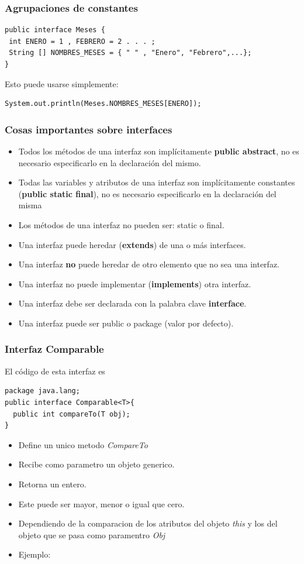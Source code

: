 \documentclass{beamer}
\begin{document}
\begin{frame}[fragile]
\frametitle{Agrupaciones de constantes}
{\color{purple}
\begin{verbatim}
public interface Meses {
 int ENERO = 1 , FEBRERO = 2 . . . ;
 String [] NOMBRES_MESES = { " " , "Enero", "Febrero",...};
}
\end{verbatim}}
\pause
Esto puede usarse simplemente:
{\color{purple}
\begin{verbatim}
System.out.println(Meses.NOMBRES_MESES[ENERO]);
\end{verbatim}}
\end{frame}

\begin{frame}[fragile]
\frametitle{Cosas importantes sobre interfaces}
\begin{itemize}[<+->]
\item     Todos los métodos de una interfaz son implícitamente \textbf{public abstract}, no es necesario especificarlo en la declaración del mismo.
\item  Todas las variables y atributos de una interfaz son implícitamente constantes (\textbf{public static final}), no es necesario especificarlo en la declaración del misma
\item  Los métodos de una interfaz no pueden ser: static o final.
\item  Una interfaz puede heredar (\textbf{extends}) de una o más interfaces.
\item  Una interfaz \textbf{no} puede heredar de otro elemento que no sea una interfaz.
\item  Una interfaz no puede implementar (\textbf{implements}) otra interfaz.
\item  Una interfaz debe ser declarada con la palabra clave \textbf{interface}.
\item  Una interfaz puede ser public o package (valor por defecto). 
\end{itemize}

\end{frame}



\begin{frame}[fragile]
\frametitle{Interfaz Comparable}
El código de esta interfaz es
\begin{verbatim}
package java.lang;
public interface Comparable<T>{
  public int compareTo(T obj);
}
\end{verbatim}
\begin{itemize}[<+->]
\item Define un unico metodo \emph{CompareTo}
\item Recibe como parametro un objeto generico.
\item Retorna un entero.
\item Este puede ser mayor, menor o igual que cero.
\item Dependiendo de la comparacion de los atributos del objeto \emph{this} y los del objeto que se pasa como paramentro \emph{Obj}
\item Ejemplo:
\end{itemize}
\end{frame}
\end{document}
